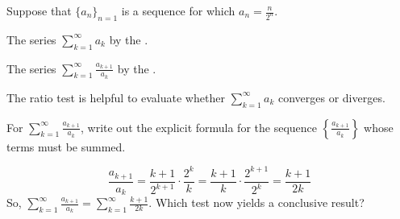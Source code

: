 \documentclass{ximera}
\author{Jim Talamo}
\begin{document}
\begin{exercise}

Suppose that $\{a_n\}_{n=1}$ is a sequence for which $a_n=\frac{n}{2^n}$.

The series $\sum_{k=1}^{\infty} a_k$  by the  . 

The series $\sum_{k=1}^{\infty} \frac{a_{k+1}}{a_k}$  by the  . 

\begin{hint}
The ratio test is helpful to evaluate whether $\sum_{k=1}^{\infty} a_k$ converges or diverges.

For $\sum_{k=1}^{\infty} \frac{a_{k+1}}{a_k}$, write out the explicit formula for the sequence $\left\{ \frac{a_{k+1}}{a_k}\right\}$ whose terms must be summed.

\[
\frac{a_{k+1}}{a_k} = \frac{k+1}{2^{k+1}} \cdot \frac{2^k}{k} = \frac{k+1}{k} \cdot \frac{2^{k+1}}{2^k} = \frac{k+1}{2k}
\]
So, $\sum_{k=1}^{\infty} \frac{a_{k+1}}{a_k} =\sum_{k=1}^{\infty} \frac{k+1}{2k}$.  Which test now yields a conclusive result?
\end{hint}

\end{exercise}
\end{document}
